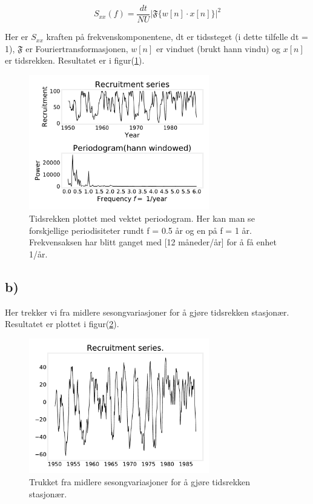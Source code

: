 \begin{equation}
    S_{xx}(f) = \frac{dt}{NU}\bigg |\mathfrak{F}\bigg\{w[n]\cdot x[n]\bigg\}\bigg |^{2}
    \label{vektet periodogram}
\end{equation}

Her er $S_{xx}$ kraften på frekvenskomponentene, dt er tidssteget (i dette tilfelle dt = 1), $\mathfrak{F}$ er Fouriertransformasjonen, $w[n]$ er vinduet (brukt hann vindu) og $x[n]$ er tidsrekken. Resultatet er i figur(\ref{task_a}).

\begin{figure}[hbt!]
{\centering
    \includegraphics[width=0.70\textwidth]{task_a.pdf}
    \caption{Tidsrekken plottet med vektet periodogram. Her kan man se forskjellige periodisiteter rundt f = 0.5 år og en på f = 1 år. Frekvensaksen har blitt ganget med [12 måneder/år] for å få enhet 1/år.}
    \label{task_a}
\par}
\end{figure}


\subsection{b)}

Her trekker vi fra midlere sesongvariasjoner for å gjøre tidsrekken stasjonær. Resultatet er plottet i figur(\ref{task_b}).

\begin{figure}[hbt!]
    {\centering
        \includegraphics[width=0.70\textwidth]{task_b.pdf}
        \caption{Trukket fra midlere sesongvariasjoner for å gjøre tidsrekken stasjonær.}
        \label{task_b}
    \par}
    \end{figure}


